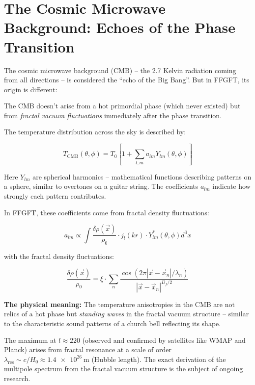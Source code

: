 \section{The Cosmic Microwave Background: Echoes of the Phase Transition}

The cosmic microwave background (CMB) -- the 2.7 Kelvin radiation coming from all directions -- is considered the ``echo of the Big Bang''. But in FFGFT, its origin is different:

The CMB doesn't arise from a hot primordial phase (which never existed) but from \textit{fractal vacuum fluctuations} immediately after the phase transition.

The temperature distribution across the sky is described by:

\begin{equation}
T_{\text{CMB}}(\theta, \phi) = T_0 \left[1 + \sum_{l,m} a_{lm} Y_{lm}(\theta, \phi)\right]
\end{equation}

Here $Y_{lm}$ are spherical harmonics -- mathematical functions describing patterns on a sphere, similar to overtones on a guitar string. The coefficients $a_{lm}$ indicate how strongly each pattern contributes.

In FFGFT, these coefficients come from fractal density fluctuations:

\begin{equation}
a_{lm} \propto \int \frac{\delta \rho(\vec{x})}{\rho_0} \cdot j_l(kr) \cdot Y_{lm}^*(\theta, \phi) d^3x
\end{equation}

with the fractal density fluctuations:

\begin{equation}
\frac{\delta \rho(\vec{x})}{\rho_0} = \xi \cdot \sum_n \frac{\cos(2\pi |\vec{x} - \vec{x}_n|/\lambda_n)}{|\vec{x} - \vec{x}_n|^{D_f/2}}
\end{equation}

\textbf{The physical meaning:} The temperature anisotropies in the CMB are not relics of a hot phase but \textit{standing waves} in the fractal vacuum structure -- similar to the characteristic sound patterns of a church bell reflecting its shape.

The maximum at $l \approx 220$ (observed and confirmed by satellites like WMAP and Planck) arises from fractal resonance at a scale of order $\lambda_{\text{res}} \sim c/H_0 \approx \SI{1.4e26}{\meter}$ (Hubble length). The exact derivation of the multipole spectrum from the fractal vacuum structure is the subject of ongoing research.

